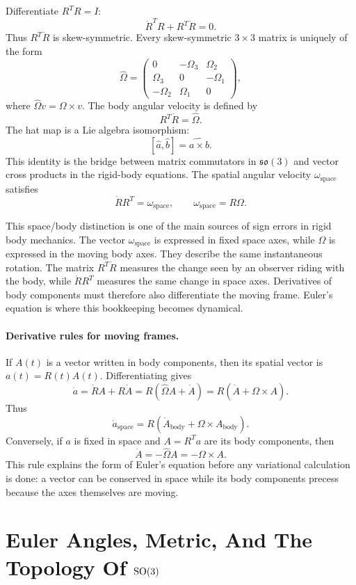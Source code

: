 Differentiate \(R^TR=I\):
\[
  \dot R^TR+R^T\dot R=0.
\]
Thus \(R^T\dot R\) is skew-symmetric. Every skew-symmetric \(3\times3\) matrix
is uniquely of the form
\[
  \widehat\Omega=
  \begin{pmatrix}
  0 & -\Omega_3 & \Omega_2\\
  \Omega_3 & 0 & -\Omega_1\\
  -\Omega_2 & \Omega_1 & 0
  \end{pmatrix},
\]
where \(\widehat\Omega v=\Omega\times v\). The body angular velocity is defined
by
\[
  R^T\dot R=\widehat\Omega.
\]
The hat map is a Lie algebra isomorphism:
\[
  [\widehat a,\widehat b]=\widehat{a\times b}.
\]
This identity is the bridge between matrix commutators in \(\mathfrak{so}(3)\)
and vector cross products in the rigid-body equations.
The spatial angular velocity \(\omega_{\mathrm{space}}\) satisfies
\[
  \dot R R^T=\widehat{\omega}_{\mathrm{space}},
  \qquad
  \omega_{\mathrm{space}}=R\Omega.
\]

This space/body distinction is one of the main sources of sign errors in rigid
body mechanics. The vector \(\omega_{\mathrm{space}}\) is expressed in fixed
space axes, while \(\Omega\) is expressed in the moving body axes. They describe
the same instantaneous rotation.  The matrix \(R^T\dot R\) measures the change
seen by an observer riding with the body, while \(\dot R R^T\) measures the
same change in space axes.  Derivatives of body components must therefore also
differentiate the moving frame. Euler's equation is where this bookkeeping
becomes dynamical.

\paragraph{Derivative rules for moving frames.}
If \(A(t)\) is a vector written in body components, then its spatial vector is
\(a(t)=R(t)A(t)\). Differentiating gives
\[
  \dot a
  =
  \dot R A+R\dot A
  =
  R(\widehat\Omega A+\dot A)
  =
  R(\dot A+\Omega\times A).
\]
Thus
\[
  \boxed{
  \dot a_{\mathrm{space}}
  =
  R\left(\dot A_{\mathrm{body}}+\Omega\times A_{\mathrm{body}}\right).
  }
\]
Conversely, if \(a\) is fixed in space and \(A=R^Ta\) are its body components,
then
\[
  \dot A
  =
  -\widehat\Omega A
  =
  -\Omega\times A.
\]
This rule explains the form of Euler's equation before any variational
calculation is done: a vector can be conserved in space while its body
components precess because the axes themselves are moving.

\section{\texorpdfstring{Euler Angles, Metric, And The Topology Of \(\operatorname{SO}(3)\)}{Euler Angles, Metric, And The Topology Of SO(3)}}
\label{sec:euler-angles-so3}

